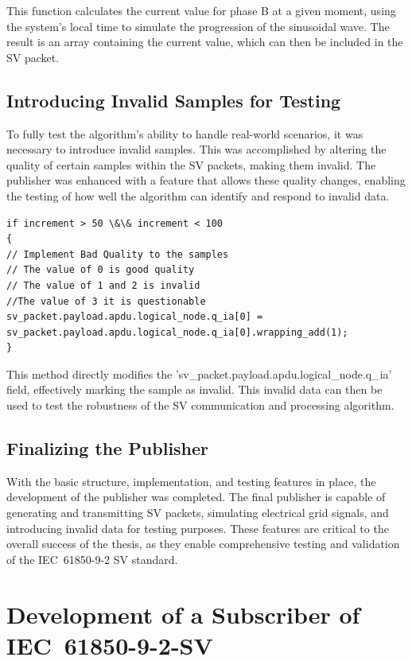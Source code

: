 This function calculates the current value for phase B at a given moment, using the system's local time to simulate the progression of the sinusoidal wave. The result is an array containing the current value, which can then be included in the SV packet.

\subsection{Introducing Invalid Samples for Testing}

To fully test the algorithm's ability to handle real-world scenarios, it was necessary to introduce invalid samples. This was accomplished by altering the quality of certain samples within the SV packets, making them invalid. The publisher was enhanced with a feature that allows these quality changes, enabling the testing of how well the algorithm can identify and respond to invalid data.

\begin{lstlisting}[caption={How to calculate the value of the SV's }]
if increment > 50 \&\& increment < 100
{
// Implement Bad Quality to the samples
// The value of 0 is good quality
// The value of 1 and 2 is invalid
//The value of 3 it is questionable
sv_packet.payload.apdu.logical_node.q_ia[0] = sv_packet.payload.apdu.logical_node.q_ia[0].wrapping_add(1);	
}
\end{lstlisting}

This method directly modifies the 'sv\_packet.payload.apdu.logical\_node.q\_ia' field, effectively marking the sample as invalid. This invalid data can then be used to test the robustness of the SV communication and processing algorithm.

\subsection{Finalizing the Publisher}

With the basic structure, implementation, and testing features in place, the development of the publisher was completed. The final publisher is capable of generating and transmitting SV packets, simulating electrical grid signals, and introducing invalid data for testing purposes. These features are critical to the overall success of the thesis, as they enable comprehensive testing and validation of the IEC~61850-9-2 SV standard.

\section{Development of a Subscriber of IEC~61850-9-2-SV}

